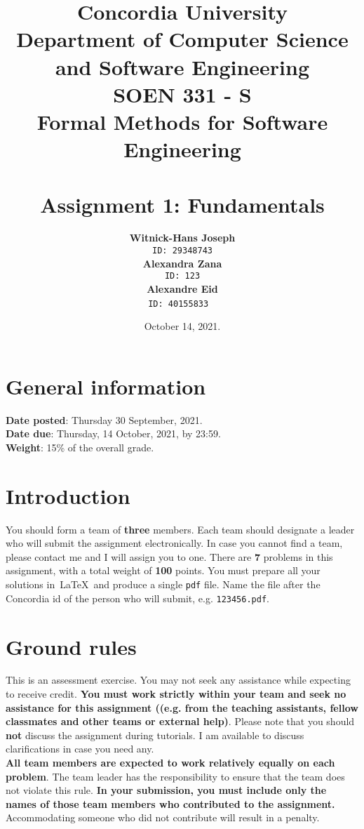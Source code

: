 \documentclass[12pt]{article}
\title{Concordia University\\
Department of Computer Science and Software Engineering\\
\textbf{SOEN 331 - S\\Formal Methods for Software Engineering}\\
\ \\
\textbf{Assignment 1: Fundamentals}}
\author{\textbf{Witnick-Hans Joseph}\\
		\texttt{ID: 29348743}\\
		\textbf{Alexandra Zana}\\
		\texttt{ID: 123}\\
		\textbf{Alexandre Eid}\\
		\texttt{ID: 40155833}
\ \\}
\date{October 14, 2021.}
\begin{document}
\maketitle

\newpage
\tableofcontents
\newpage

\section{General information}

\noindent \textbf{Date posted}: Thursday 30 September, 2021.\\
\noindent \textbf{Date due}: Thursday, 14 October, 2021, by 23:59.\\
\noindent \textbf{Weight}: 15\% of the overall grade.

\section{Introduction}
You should form a team of \textbf{three} members. Each team should designate a leader who will submit the assignment electronically. In case you cannot find a team, please contact me and I will assign you to one. There are \textbf{7} problems in this assignment, with a total weight of \textbf{100} points. You must prepare all your solutions in~\LaTeX~and produce a single \texttt{pdf} file. Name the file after the Concordia id of the person who will submit, e.g. \texttt{123456.pdf}.\\

\section{Ground rules}

This is an assessment exercise.  You may not seek any assistance while expecting to receive credit. \textbf{You must work strictly within your team and seek no assistance for this assignment ((e.g. from the teaching assistants, fellow classmates and other teams or external help)}. Please note that you should \textbf{not} discuss the assignment during tutorials. I am available to discuss clarifications in case you need any.\\

\noindent \textbf{All team members are expected to work relatively equally on each problem}. The team leader has the responsibility to ensure that the team does not violate this rule. \textbf{In your submission, you must include only the names of those team members who contributed to the assignment.} Accommodating someone who did not contribute will result in a penalty.\\
\end{document}
